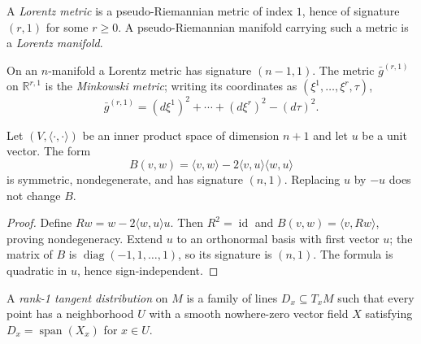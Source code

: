 \begin{definition}
\label{def:lorentz-metric}
\leanok
{}
A \emph{Lorentz metric} is a pseudo-Riemannian metric of index $1$, hence of
signature $(r,1)$ for some $r\geq0$. A pseudo-Riemannian manifold carrying such a
metric is a \emph{Lorentz manifold}.
\end{definition}

On an $n$-manifold a Lorentz metric has signature $(n-1,1)$. The metric
$\bar g^{(r,1)}$ on $\mathbb R^{r,1}$ is the \emph{Minkowski metric}; writing its
coordinates as $(\xi^1,\ldots,\xi^r,\tau)$,
\begin{equation}
\bar g^{(r,1)}=(d\xi^1)^2+\cdots+(d\xi^r)^2-(d\tau)^2. \tag{2.25}
\end{equation}

\begin{lemma}
\label{lem:lorentz-form-pointwise}
\leanok
{}
Let $(V,\langle\cdot,\cdot\rangle)$ be an inner product space of dimension $n+1$
and let $u$ be a unit vector. The form
\[
B(v,w)=\langle v,w\rangle
 -2\langle v,u\rangle\langle w,u\rangle
\]
is symmetric, nondegenerate, and has signature $(n,1)$. Replacing $u$ by $-u$
does not change $B$.
\end{lemma}

\begin{proof}
\leanok
{}
\sketch Define $Rw=w-2\langle w,u\rangle u$. Then $R^2=\operatorname{id}$ and
$B(v,w)=\langle v,Rw\rangle$, proving nondegeneracy. Extend $u$ to an orthonormal
basis with first vector $u$; the matrix of $B$ is
$\operatorname{diag}(-1,1,\ldots,1)$, so its signature is $(n,1)$. The formula is
quadratic in $u$, hence sign-independent.
\end{proof}

\begin{definition}
\label{def:rank-one-distribution}
\leanok
A \emph{rank-1 tangent distribution} on $M$ is a family of lines
$D_x\subseteq T_xM$ such that every point has a neighborhood $U$ with a smooth
nowhere-zero vector field $X$ satisfying $D_x=\operatorname{span}(X_x)$ for
$x\in U$.
\end{definition}

